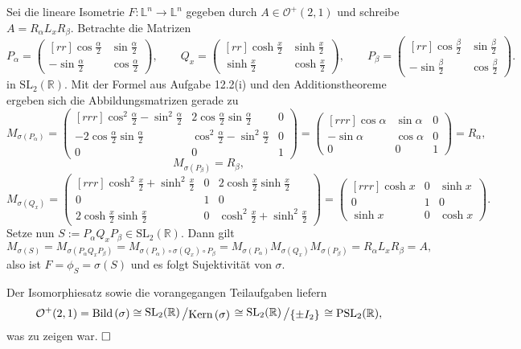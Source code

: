\documentclass[11pt]{book}
\numberwithin{dummy}{section}
\theoremstyle{nonumberbreak}
\newenvironment{prob}[1][]{\ifthenelse{\equal{#1}{}}{\problem}{\problem[#1]}\rm}{\endproblem}
\newenvironment{sol}[1][]{\ifthenelse{\equal{#1}{}}{\solution}{\solution[#1]}\rm}{\endsolution}
\newcommand{\Loid}{\mathbb{L}}
\newcommand{\R}{\mathbb{R}}
\newcommand{\la}{\longrightarrow}
\newcommand{\matxx}[4]{\begin{pmatrix}[rr]#1 & #2 \\ #3 & #4 \end{pmatrix}}
\newcommand{\Matx}[9]{\begin{pmatrix}[rrr]#1 & #2 & #3 \\ #4 & #5 & #6 \\ #7 & #8 & #9 \end{pmatrix}}
\newcommand{\slant}[2]{{\raisebox{.1em}{$#1$}\left/\raisebox{-.1em}{$#2$}\right.}}
\begin{document}
\begin{spacing}{1.4}
\begin{prob}
\begin{sol}
\begin{compactenum}
\item Sei die lineare Isometrie $F:\Loid^n \la \Loid^n$ gegeben durch $A \in \mathcal{O}^+(2,1)$ und schreibe $A=R_{\alpha}L_x R_{\beta}$. Betrachte die Matrizen 
$$P_{\alpha}=\matxx{\cos \frac{\alpha}{2}}{\sin \frac{\alpha}{2}}{-\sin \frac{\alpha}{2}}{\cos \frac{\alpha}{2}}, \qquad Q_x=\matxx{\cosh \frac{x}{2}}{\sinh \frac{x}{2}}{\sinh \frac{x}{2}}{\cosh \frac{x}{2}}, \qquad P_{\beta}=\matxx{\cos \frac{\beta}{2}}{\sin \frac{\beta}{2}}{-\sin \frac{\beta}{2}}{\cos \frac{\beta}{2}}.$$
in $\mathrm{SL}_2(\R)$. Mit der Formel aus Aufgabe 12.2(i) und den Additionstheoreme ergeben sich die Abbildungsmatrizen gerade zu 
$$M_{\sigma(P_{\alpha})}=\Matx{\cos^2 \frac{\alpha}{2}- \sin^2 \frac{\alpha}{2}}{2 \cos \frac{\alpha}{2} \sin \frac{\alpha}{2}}{0}{-2 \cos \frac{\alpha}{2} \sin \frac{\alpha}{2}}{\cos^2 \frac{\alpha}{2}- \sin^2 \frac{\alpha}{2}}{0}{0}{0}{1} = \Matx{\cos \alpha}{\sin \alpha}{0}{-\sin \alpha}{\cos \alpha}{0}{0}{0}{1} = R_{\alpha},$$
$$M_{\sigma(P_{\beta})}=R_{\beta},$$
$$M_{\sigma(Q_x)} = \Matx{\cosh^2 \frac{x}{2} + \sinh^2 \frac{x}{2}}{0}{2 \cosh \frac{x}{2} \sinh \frac{x}{2}}{0}{1}{0}{2 \cosh \frac{x}{2} \sinh \frac{x}{2}}{0}{\cosh^2 \frac{x}{2} + \sinh^2 \frac{x}{2}}= \Matx{\cosh x}{0}{\sinh x}{0}{1}{0}{\sinh x}{0}{\cosh x}.$$
Setze nun $S:=P_{\alpha}Q_xP_{\beta} \in \mathrm{SL}_2(\R)$. Dann gilt 
$$M_{\sigma(S)} = M_{\sigma(P_{\alpha}Q_xP_{\beta})} = M_{\sigma(P_{\alpha}) \circ \sigma(Q_x) \circ P_{\beta}} = M_{\sigma(P_{\alpha})} M_{\sigma(Q_x)} M_{\sigma(P_{\beta})} = R_{\alpha} L_x R_{\beta} = A,$$
also ist $F=\phi_S=\sigma(S)$ und es folgt Sujektivität von $\sigma$.

\item Der Isomorphiesatz sowie die vorangegangen Teilaufgaben liefern
$$\mathcal{O}^+(2,1) = \mathrm{Bild}\hspace{1.5pt}(\sigma) \cong \slant{\mathrm{SL}_2(\R)}{\mathrm{Kern}\hspace{1.5pt} (\sigma)} \cong \slant{\mathrm{SL}_2(\R)}{\{\pm I_2\}} \cong \mathrm{PSL}_2(\R),$$
was zu zeigen war. $\hfill \Box$

 
\end{compactenum}

\end{sol}

\end{prob}






















\end{spacing}
\end{document}
